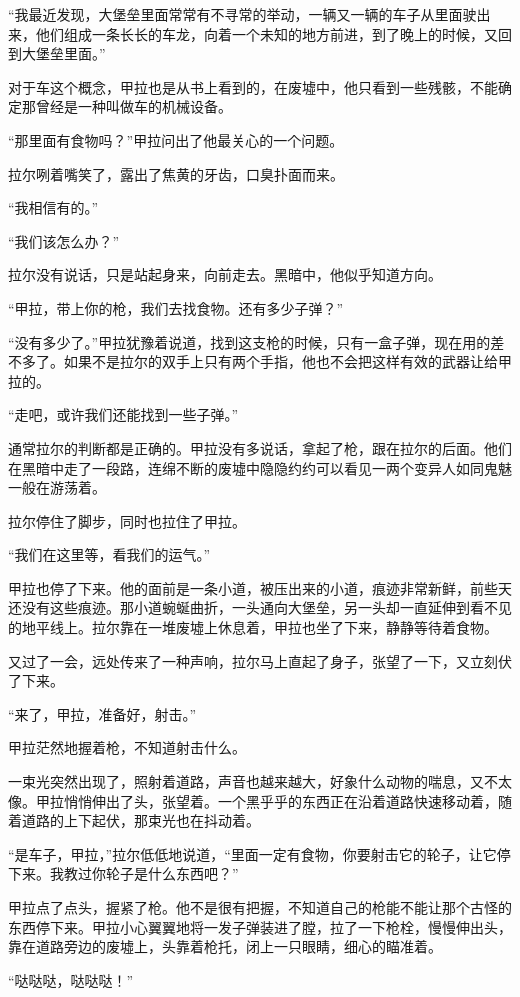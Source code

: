 “我最近发现，大堡垒里面常常有不寻常的举动，一辆又一辆的车子从里面驶出来，他们组成一条长长的车龙，向着一个未知的地方前进，到了晚上的时候，又回到大堡垒里面。”

对于车这个概念，甲拉也是从书上看到的，在废墟中，他只看到一些残骸，不能确定那曾经是一种叫做车的机械设备。

“那里面有食物吗？”甲拉问出了他最关心的一个问题。

拉尔咧着嘴笑了，露出了焦黄的牙齿，口臭扑面而来。

“我相信有的。”

“我们该怎么办？”

拉尔没有说话，只是站起身来，向前走去。黑暗中，他似乎知道方向。

“甲拉，带上你的枪，我们去找食物。还有多少子弹？”

“没有多少了。”甲拉犹豫着说道，找到这支枪的时候，只有一盒子弹，现在用的差不多了。如果不是拉尔的双手上只有两个手指，他也不会把这样有效的武器让给甲拉的。

“走吧，或许我们还能找到一些子弹。”

通常拉尔的判断都是正确的。甲拉没有多说话，拿起了枪，跟在拉尔的后面。他们在黑暗中走了一段路，连绵不断的废墟中隐隐约约可以看见一两个变异人如同鬼魅一般在游荡着。

拉尔停住了脚步，同时也拉住了甲拉。

“我们在这里等，看我们的运气。”

甲拉也停了下来。他的面前是一条小道，被压出来的小道，痕迹非常新鲜，前些天还没有这些痕迹。那小道蜿蜒曲折，一头通向大堡垒，另一头却一直延伸到看不见的地平线上。拉尔靠在一堆废墟上休息着，甲拉也坐了下来，静静等待着食物。

又过了一会，远处传来了一种声响，拉尔马上直起了身子，张望了一下，又立刻伏了下来。

“来了，甲拉，准备好，射击。”

甲拉茫然地握着枪，不知道射击什么。

一束光突然出现了，照射着道路，声音也越来越大，好象什么动物的喘息，又不太像。甲拉悄悄伸出了头，张望着。一个黑乎乎的东西正在沿着道路快速移动着，随着道路的上下起伏，那束光也在抖动着。

“是车子，甲拉，”拉尔低低地说道，“里面一定有食物，你要射击它的轮子，让它停下来。我教过你轮子是什么东西吧？”

甲拉点了点头，握紧了枪。他不是很有把握，不知道自己的枪能不能让那个古怪的东西停下来。甲拉小心翼翼地将一发子弹装进了膛，拉了一下枪栓，慢慢伸出头，靠在道路旁边的废墟上，头靠着枪托，闭上一只眼睛，细心的瞄准着。

“哒哒哒，哒哒哒！”

